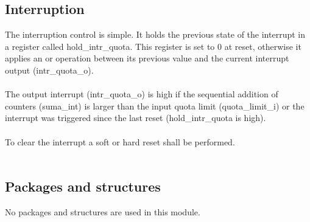 \subsection{Interruption}
The interruption control is simple. It holds the previous state of the interrupt in a register called hold\_intr\_quota. This register is set to 0 at reset, otherwise it applies an or operation between its previous value and the current interrupt output (intr\_quota\_o).\\
\\
The output interrupt (intr\_quota\_o) is high if the sequential addition of counters (suma\_int) is larger than the input quota limit (quota\_limit\_i) or the interrupt was triggered since the last reset (hold\_intr\_quota is high).\\
\\
To clear the interrupt a soft or hard reset shall be performed.\\
\\

\subsection{Packages and structures}

No packages and structures are used in this module.

